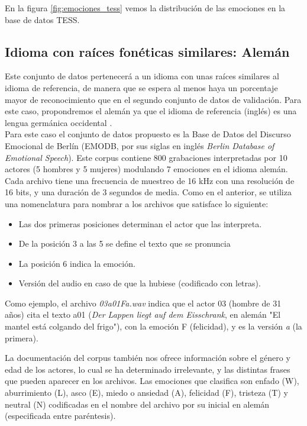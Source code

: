\documentclass[11pt,a4paper,spanish]{book}
\begin{document}
	En la figura \ref{fig:emociones_tess} vemos la distribución de las emociones en la base de datos TESS.


	
	\subsection{Idioma con raíces fonéticas similares: Alemán} Este conjunto de datos pertenecerá a un idioma con unas raíces similares al idioma de referencia, de manera que se espera al menos haya un porcentaje mayor de reconocimiento que en el segundo conjunto de datos de validación. Para este caso, propondremos el alemán ya que el idioma de referencia (inglés) es una lengua germánica occidental \cite{wikipediaIngles2019}.\\
	
	Para este caso el conjunto de datos propuesto es la Base de Datos del Discurso Emocional de Berlín (EMODB, por sus siglas en inglés \emph{Berlin Database of Emotional Speech}). Este corpus contiene 800 grabaciones interpretadas por 10 actores (5 hombres y 5 mujeres) modulando 7 emociones en el idioma alemán. Cada archivo tiene una frecuencia de muestreo de 16 kHz con una resolución de 16 bits, y una duración de 3 segundos de media. Como en el anterior, se utiliza una nomenclatura para nombrar a los archivos que satisface lo siguiente:
	\begin{itemize}
		\item Las dos primeras posiciones determinan el actor que las interpreta.
		\item De la posición 3 a las 5 se define el texto que se pronuncia
		\item La posición 6 indica la emoción.
		\item Versión del audio en caso de que la hubiese (codificado con letras).
	\end{itemize}

	Como ejemplo, el archivo \emph{03a01Fa.wav} indica que el actor 03 (hombre de 31 años) cita el texto a01 (\emph{Der Lappen liegt auf dem Eisschrank}, en alemán "El mantel está colgando del frigo"), con la emoción F (felicidad), y es la versión \emph{a} (la primera).
	
	La documentación del corpus también nos ofrece información sobre el género y edad de los actores, lo cual se ha determinado irrelevante, y las distintas frases que pueden aparecer en los archivos.
	Las emociones que clasifica son enfado (W), aburrimiento (L), asco (E), miedo o ansiedad (A), felicidad (F), tristeza (T) y neutral (N) codificadas en el nombre del archivo por su inicial en alemán (especificada entre paréntesis).
	
\end{document}

